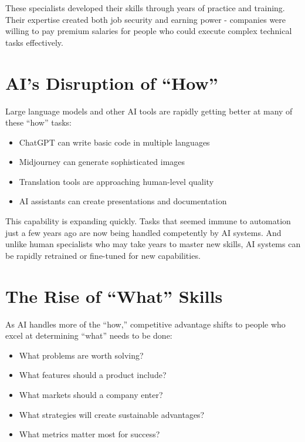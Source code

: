 \documentclass[
  Letterpaper,
]{scrbook}
\providecommand{\tightlist}{%
  \setlength{\itemsep}{0pt}\setlength{\parskip}{0pt}}\usepackage{longtable,booktabs,array}
\begin{document}
These specialists developed their skills through years of practice and
training. Their expertise created both job security and earning power -
companies were willing to pay premium salaries for people who could
execute complex technical tasks effectively.

\section{AI's Disruption of ``How''}\label{ais-disruption-of-how}

Large language models and other AI tools are rapidly getting better at
many of these ``how'' tasks:

\begin{itemize}
\tightlist
\item
  ChatGPT can write basic code in multiple languages
\item
  Midjourney can generate sophisticated images
\item
  Translation tools are approaching human-level quality
\item
  AI assistants can create presentations and documentation
\end{itemize}

This capability is expanding quickly. Tasks that seemed immune to
automation just a few years ago are now being handled competently by AI
systems. And unlike human specialists who may take years to master new
skills, AI systems can be rapidly retrained or fine-tuned for new
capabilities.

\section{The Rise of ``What'' Skills}\label{the-rise-of-what-skills}

As AI handles more of the ``how,'' competitive advantage shifts to
people who excel at determining ``what'' needs to be done:

\begin{itemize}
\tightlist
\item
  What problems are worth solving?
\item
  What features should a product include?
\item
  What markets should a company enter?
\item
  What strategies will create sustainable advantages?
\item
  What metrics matter most for success?
\end{itemize}
\end{document}
